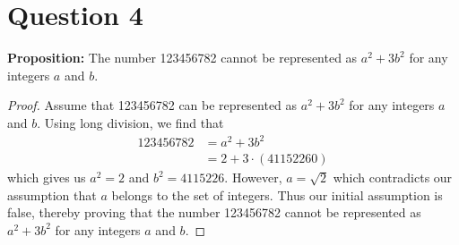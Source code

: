 \documentclass[11pt, oneside]{article}   	%
\begin{document}
\section*{Question 4}

\textbf{Proposition:} The number 123456782 cannot be represented as $a^2+3b^2$ for any integers $a$ and $b$.

\begin{proof}
Assume that 123456782 can be represented as $a^2+3b^2$ for any integers $a$ and $b$. Using long division, we find that
\begin{align*}
	123456782 & = a^2+3b^2 \\
	& = 2 + 3 \cdot (41152260)
\end{align*}
which gives us $a^2=2$ and $b^2=4115226$. However, $a=\sqrt{2}$ which contradicts our assumption that $a$ belongs to the set of integers. Thus our initial assumption is false, thereby proving that the number 123456782 cannot be represented as $a^2+3b^2$ for any integers $a$ and $b$.
\end{proof}

\cleardoublepage
\end{document}
